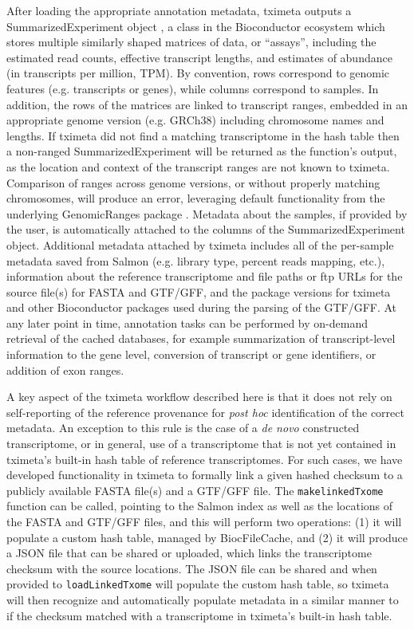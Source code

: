 \documentclass[12pt]{article} \usepackage[utf8]{inputenc}
\begin{document}
After loading the appropriate annotation metadata, tximeta outputs a
SummarizedExperiment object \citep{granges}, a class in the
Bioconductor ecosystem which stores multiple similarly shaped matrices
of data, or ``assays'', including the estimated read counts, effective
transcript lengths, and estimates of abundance (in transcripts per
million, TPM). By convention, rows correspond to genomic features
(e.g. transcripts or genes), while columns correspond to samples. In
addition, the rows of the matrices are linked to transcript ranges,
embedded in an appropriate genome version (e.g. GRCh38) including
chromosome names and lengths. If tximeta did not find a matching
transcriptome in the hash table then a non-ranged SummarizedExperiment
will be returned as the function's output, as the location and context
of the transcript ranges are not known to tximeta. Comparison of
ranges across genome versions, or without properly matching
chromosomes, will produce an error, leveraging default functionality
from the underlying GenomicRanges package \citep{granges}. Metadata
about the samples, if provided by the user, is automatically attached
to the columns of the SummarizedExperiment object. Additional metadata
attached by tximeta includes all of the per-sample metadata saved from
Salmon (e.g. library type, percent reads mapping, etc.), information
about the reference transcriptome and file paths or ftp URLs for the source file(s)
for FASTA and GTF/GFF, and the package versions for tximeta and other
Bioconductor packages used during the parsing of the GTF/GFF. At any
later point in time, annotation tasks can be performed by on-demand
retrieval of the cached databases, for example summarization of
transcript-level information to the gene level, conversion of
transcript or gene identifiers, or addition of exon ranges.

A key aspect of the tximeta workflow described here is that it does
not rely on self-reporting of the reference provenance for
\textit{post hoc} identification of the correct metadata. An exception
to this rule is the case of a \textit{de novo} constructed
transcriptome, or in general, use of a transcriptome that is not yet
contained in tximeta's built-in hash table of reference
transcriptomes. For such cases, we have developed functionality in
tximeta to formally link a given hashed checksum to a publicly
available FASTA file(s) and a GTF/GFF file. The
\texttt{makelinkedTxome} function can be called, pointing to the
Salmon index as well as the locations of the FASTA and GTF/GFF files, and
this will perform two operations: (1) it will populate a custom hash
table, managed by BiocFileCache, and (2) it will produce a JSON file
that can be shared or uploaded, which links the transcriptome checksum
with the source locations. The JSON file can be shared and when
provided to \texttt{loadLinkedTxome} will populate the custom hash
table, so tximeta will then recognize and automatically populate
metadata in a similar manner to if the checksum matched with a
transcriptome in tximeta's built-in hash table.
\end{document}
